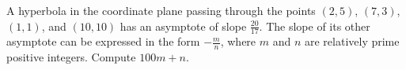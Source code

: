 A hyperbola in the coordinate plane passing through the points $(2,5)$, $(7,3)$, $(1,1)$, and $(10,10)$ has an asymptote of slope $\frac{20}{17}$. The slope of its other asymptote can be expressed in the form $-\frac{m}{n}$, where $m$ and $n$ are relatively prime positive integers. Compute $100m+n$.
